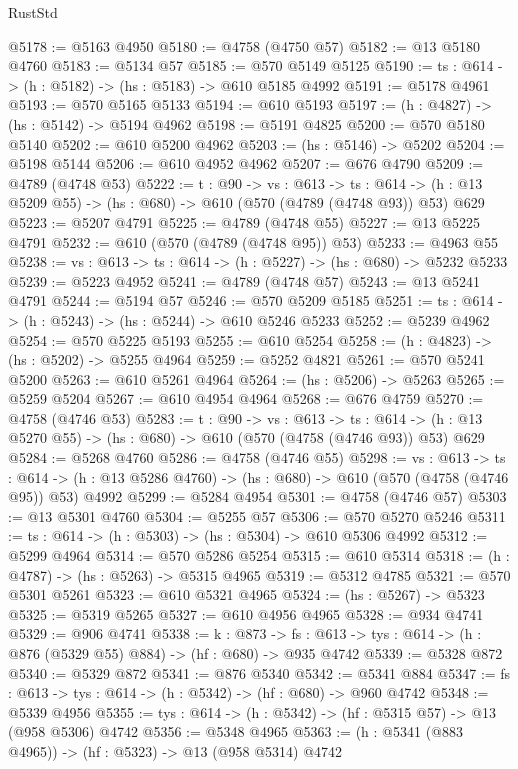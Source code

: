 \begin{lexlean}{RustStd}
\begin{coremodule}
@5178 := @5163 @4950
@5180 := @4758 (@4750 @57)
@5182 := @13 @5180 @4760
@5183 := @5134 @57
@5185 := @570 @5149 @5125
@5190 := {ts : @614} -> (h : @5182) -> (hs : @5183) -> @610 @5185 @4992
@5191 := @5178 @4961
@5193 := @570 @5165 @5133
@5194 := @610 @5193
@5197 := (h : @4827) -> (hs : @5142) -> @5194 @4962
@5198 := @5191 @4825
@5200 := @570 @5180 @5140
@5202 := @610 @5200 @4962
@5203 := (hs : @5146) -> @5202
@5204 := @5198 @5144
@5206 := @610 @4952 @4962
@5207 := @676 @4790
@5209 := @4789 (@4748 @53)
@5222 := {t : @90} ->
  {vs : @613} ->
  {ts : @614} -> (h : @13 @5209 @55) -> (hs : @680) -> @610 (@570 (@4789 (@4748 @93)) @53) @629
@5223 := @5207 @4791
@5225 := @4789 (@4748 @55)
@5227 := @13 @5225 @4791
@5232 := @610 (@570 (@4789 (@4748 @95)) @53)
@5233 := @4963 @55
@5238 := {vs : @613} -> {ts : @614} -> (h : @5227) -> (hs : @680) -> @5232 @5233
@5239 := @5223 @4952
@5241 := @4789 (@4748 @57)
@5243 := @13 @5241 @4791
@5244 := @5194 @57
@5246 := @570 @5209 @5185
@5251 := {ts : @614} -> (h : @5243) -> (hs : @5244) -> @610 @5246 @5233
@5252 := @5239 @4962
@5254 := @570 @5225 @5193
@5255 := @610 @5254
@5258 := (h : @4823) -> (hs : @5202) -> @5255 @4964
@5259 := @5252 @4821
@5261 := @570 @5241 @5200
@5263 := @610 @5261 @4964
@5264 := (hs : @5206) -> @5263
@5265 := @5259 @5204
@5267 := @610 @4954 @4964
@5268 := @676 @4759
@5270 := @4758 (@4746 @53)
@5283 := {t : @90} ->
  {vs : @613} ->
  {ts : @614} -> (h : @13 @5270 @55) -> (hs : @680) -> @610 (@570 (@4758 (@4746 @93)) @53) @629
@5284 := @5268 @4760
@5286 := @4758 (@4746 @55)
@5298 := {vs : @613} ->
  {ts : @614} -> (h : @13 @5286 @4760) -> (hs : @680) -> @610 (@570 (@4758 (@4746 @95)) @53) @4992
@5299 := @5284 @4954
@5301 := @4758 (@4746 @57)
@5303 := @13 @5301 @4760
@5304 := @5255 @57
@5306 := @570 @5270 @5246
@5311 := {ts : @614} -> (h : @5303) -> (hs : @5304) -> @610 @5306 @4992
@5312 := @5299 @4964
@5314 := @570 @5286 @5254
@5315 := @610 @5314
@5318 := (h : @4787) -> (hs : @5263) -> @5315 @4965
@5319 := @5312 @4785
@5321 := @570 @5301 @5261
@5323 := @610 @5321 @4965
@5324 := (hs : @5267) -> @5323
@5325 := @5319 @5265
@5327 := @610 @4956 @4965
@5328 := @934 @4741
@5329 := @906 @4741
@5338 := {k : @873} ->
  {fs : @613} -> {tys : @614} -> (h : @876 (@5329 @55) @884) -> (hf : @680) -> @935 @4742
@5339 := @5328 @872
@5340 := @5329 @872
@5341 := @876 @5340
@5342 := @5341 @884
@5347 := {fs : @613} -> {tys : @614} -> (h : @5342) -> (hf : @680) -> @960 @4742
@5348 := @5339 @4956
@5355 := {tys : @614} -> (h : @5342) -> (hf : @5315 @57) -> @13 (@958 @5306) @4742
@5356 := @5348 @4965
@5363 := (h : @5341 (@883 @4965)) -> (hf : @5323) -> @13 (@958 @5314) @4742

\end{coremodule}
\end{lexlean}
